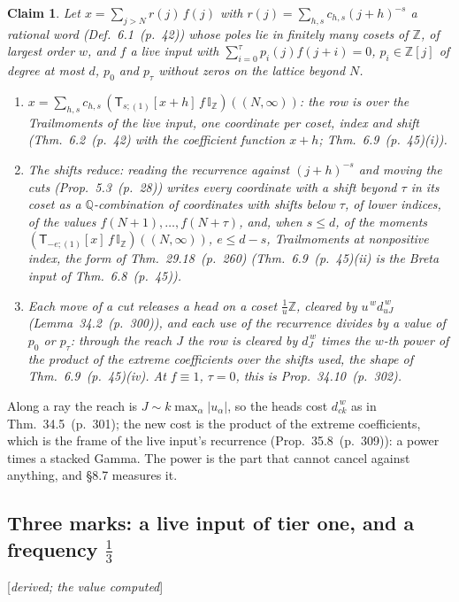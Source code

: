 \documentclass[11pt]{article}
\newcommand{\sT}{\mathsf T}
\newcommand{\IZ}{\mathbb I_{\mathbb Z}}
\newcommand{\status}[1]{\hfill{\small[\textit{#1}]}}
\newcommand{\hb}[2]{#1~(p.~#2)}   %
\theoremstyle{plain}
\newtheorem{claim}{Claim}[section]
\theoremstyle{remark}
\begin{document}
\begin{claim}\label{cl:liverow}
Let $x=\sum_{j>N}r(j)\,f(j)$ with $r(j)=\sum_{h,s}c_{h,s}(j+h)^{-s}$ a rational word (Def.~\hb{6.1}{42}) whose poles lie in finitely many cosets of $\mathbb Z$, of largest order $w$, and $f$ a live input with $\sum_{i=0}^\tau p_i(j)f(j+i)=0$, $p_i\in\mathbb Z[j]$ of degree at most $d$, $p_0$ and $p_\tau$ without zeros on the lattice beyond $N$.
\begin{enumerate}[label=(\roman*)]
\item $x=\sum_{h,s}c_{h,s}\,(\sT_{s;(1)}[x+h]\,f\,\IZ)((N,\infty))$: the row is over the Trailmoments of the live input, one coordinate per coset, index and shift (Thm.~\hb{6.2}{42} with the coefficient function $x+h$; Thm.~\hb{6.9}{45}(i)).
\item The shifts reduce: reading the recurrence against $(j+h)^{-s}$ and moving the cuts (Prop.~\hb{5.3}{28}) writes every coordinate with a shift beyond $\tau$ in its coset as a $\mathbb Q$-combination of coordinates with shifts below $\tau$, of lower indices, of the values $f(N+1),\dots,f(N+\tau)$, and, when $s\le d$, of the moments $(\sT_{-e;(1)}[x]\,f\,\IZ)((N,\infty))$, $e\le d-s$, Trailmoments at nonpositive index, the form of Thm.~\hb{29.18}{260} (Thm.~\hb{6.9}{45}(ii) is the Breta input of Thm.~\hb{6.8}{45}).
\item Each move of a cut releases a head on a coset $\frac1u\mathbb Z$, cleared by $u^{\,w}d_{uJ}^{\,w}$ (Lemma~\hb{34.2}{300}), and each use of the recurrence divides by a value of $p_0$ or $p_\tau$: through the reach $J$ the row is cleared by $d_{J}^{\,w}$ times the $w$-th power of the product of the extreme coefficients over the shifts used, the shape of Thm.~\hb{6.9}{45}(iv). At $f\equiv1$, $\tau=0$, this is Prop.~\hb{34.10}{302}.
\end{enumerate}
\end{claim}

Along a ray the reach is $J\sim k\max_\alpha|u_\alpha|$, so the heads cost $d_{ck}^{\,w}$ as in Thm.~\hb{34.5}{301}; the new cost is the product of the extreme coefficients, which is the frame of the live input's recurrence (Prop.~\hb{35.8}{309}): a power times a stacked Gamma. The power is the part that cannot cancel against anything, and \S8.7 measures it.

\subsection{Three marks: a live input of tier one, and a frequency $\frac13$}\status{derived; the value computed}
\end{document}
